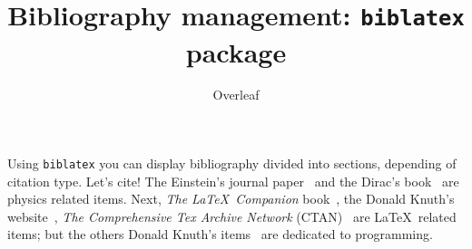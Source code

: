 \documentclass{article}
\title{Bibliography management: \texttt{biblatex} package}
\author{Overleaf}
\date{ }
\begin{document}
\maketitle

Using \texttt{biblatex} you can display bibliography divided into sections,
depending of citation type.
Let's cite! The Einstein's journal paper~\cite{einstein} and the Dirac's
book~\cite{dirac} are physics related items.
Next, \textit{The \LaTeX\ Companion} book~\cite{latexcompanion}, the Donald
Knuth's website~\cite{knuthwebsite}, \textit{The Comprehensive Tex Archive
	Network} (CTAN)~\cite{ctan} are \LaTeX\ related items; but the others Donald
Knuth's items~\cite{knuth-fa,knuth-acp} are dedicated to programming.

\medskip

\printbibliography%
\end{document}
